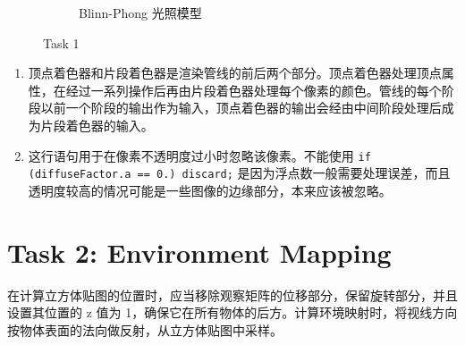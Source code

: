 \documentclass[UTF8]{ctexart}
\begin{document}
\begin{figure}[htbp]
\begin{subfigure}[b]{0.49\textwidth}
        \caption{Blinn-Phong 光照模型}
    \end{subfigure}
    \caption*{Task 1}
\end{figure}

\begin{enumerate}
    \item 顶点着色器和片段着色器是渲染管线的前后两个部分。顶点着色器处理顶点属性，在经过一系列操作后再由片段着色器处理每个像素的颜色。管线的每个阶段以前一个阶段的输出作为输入，顶点着色器的输出会经由中间阶段处理后成为片段着色器的输入。
    \item 这行语句用于在像素不透明度过小时忽略该像素。不能使用 \texttt{if (diffuseFactor.a == 0.) discard;} 是因为浮点数一般需要处理误差，而且透明度较高的情况可能是一些图像的边缘部分，本来应该被忽略。
\end{enumerate}

\section*{Task 2: Environment Mapping}

在计算立方体贴图的位置时，应当移除观察矩阵的位移部分，保留旋转部分，并且设置其位置的 z 值为 1，确保它在所有物体的后方。计算环境映射时，将视线方向按物体表面的法向做反射，从立方体贴图中采样。
\end{document}
